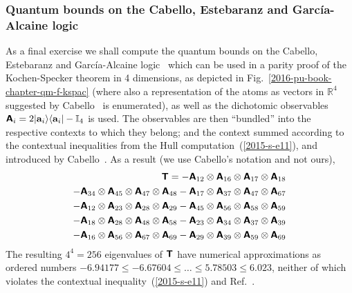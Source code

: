 \subsubsection{Quantum bounds on the Cabello, Estebaranz and Garc{\'{i}}a-Alcaine logic}

As a final exercise we shall compute the quantum bounds on the Cabello, Estebaranz and Garc{\'{i}}a-Alcaine logic~\cite{cabello-96,cabello-99}
which can be used in a parity proof of the Kochen-Specker theorem in 4 dimensions,
as depicted in Fig.~\ref{2016-pu-book-chapter-qm-f-kspac} (where also a
representation of the atoms as  vectors in $\mathbb{R}^4$
suggested by Cabello~\cite[Fig.~1]{cabello:210401} is enumerated),
as well as  the dichotomic observables~\cite[Eq.~(2)]{cabello:210401}
$\textsf{\textbf{A}}_i = 2 \vert {\bf a}_i \rangle \langle {\bf a}_i \vert - \mathbb{I}_4$ is used.
The observables are then ``bundled'' into the respective contexts to which they belong; and the context summed
according to the contextual inequalities from the Hull computation~(\ref{2015-s-e11}), and
introduced by Cabello~\cite[Eq.~(1)]{cabello:210401}.
As a result (we use Cabello's notation and not ours),
\begin{equation}
\begin{split}
\textsf{\textbf{T}}=-   \textsf{\textbf{A}}_{12} \otimes  \textsf{\textbf{A}}_{16} \otimes  \textsf{\textbf{A}}_{17} \otimes   \textsf{\textbf{A}}_{18}    \\
   -   \textsf{\textbf{A}}_{34} \otimes  \textsf{\textbf{A}}_{45} \otimes  \textsf{\textbf{A}}_{47} \otimes   \textsf{\textbf{A}}_{48}
   -   \textsf{\textbf{A}}_{17} \otimes  \textsf{\textbf{A}}_{37} \otimes  \textsf{\textbf{A}}_{47} \otimes   \textsf{\textbf{A}}_{67}                      \\
   -   \textsf{\textbf{A}}_{12} \otimes  \textsf{\textbf{A}}_{23} \otimes  \textsf{\textbf{A}}_{28} \otimes   \textsf{\textbf{A}}_{29}
   -   \textsf{\textbf{A}}_{45} \otimes  \textsf{\textbf{A}}_{56} \otimes  \textsf{\textbf{A}}_{58} \otimes   \textsf{\textbf{A}}_{59}                     \\
   -   \textsf{\textbf{A}}_{18} \otimes  \textsf{\textbf{A}}_{28} \otimes  \textsf{\textbf{A}}_{48} \otimes   \textsf{\textbf{A}}_{58}
   -   \textsf{\textbf{A}}_{23} \otimes  \textsf{\textbf{A}}_{34} \otimes  \textsf{\textbf{A}}_{37} \otimes   \textsf{\textbf{A}}_{39}                     \\
   -   \textsf{\textbf{A}}_{16} \otimes  \textsf{\textbf{A}}_{56} \otimes  \textsf{\textbf{A}}_{67} \otimes   \textsf{\textbf{A}}_{69}
   -   \textsf{\textbf{A}}_{29} \otimes  \textsf{\textbf{A}}_{39} \otimes  \textsf{\textbf{A}}_{59} \otimes   \textsf{\textbf{A}}_{69}
\end{split}
\label{e-2017-b-whatever-e7cabnc}
\end{equation}
The resulting $4^4=256$ eigenvalues of $\textsf{\textbf{T}}$
have numerical approximations as ordered numbers
$ -6.94177 \le  -6.67604\le   \ldots \le  5.78503\le  6.023$,
neither of which violates the contextual inequality~(\ref{2015-s-e11}) and Ref.~\cite[Eq.~(1)]{cabello:210401}.


